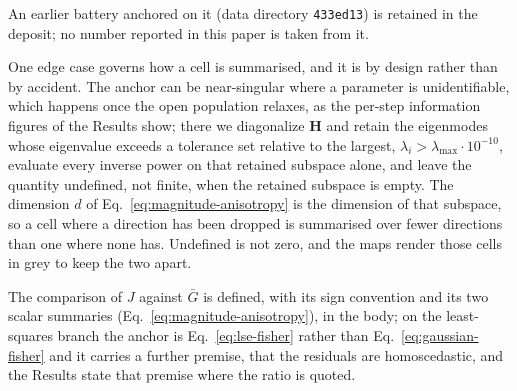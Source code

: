 An earlier battery anchored on it (data directory \texttt{433ed13}) is retained in the
deposit; no number reported in this paper is taken from it.

One edge case governs how a cell is summarised, and it is by design rather than by accident. The anchor can be near-singular where a parameter is unidentifiable, which happens once the open population relaxes, as the per-step information figures of the Results show; there we diagonalize $\mathbf{H}$ and retain the eigenmodes whose eigenvalue exceeds a tolerance set relative to the largest, $\lambda_i > \lambda_{\max}\cdot 10^{-10}$, evaluate every inverse power on that retained subspace alone, and leave the quantity undefined, not finite, when the retained subspace is empty. The dimension $d$ of Eq.~\ref{eq:magnitude-anisotropy} is the dimension of that subspace, so a cell where a direction has been dropped is summarised over fewer directions than one where none has. Undefined is not zero, and the maps render those cells in grey to keep the two apart.

The comparison of $J$ against $\bar G$ is defined, with its sign convention and its two
scalar summaries (Eq.~\ref{eq:magnitude-anisotropy}), in the body; on the least-squares branch the
anchor is Eq.~\ref{eq:lse-fisher} rather than Eq.~\ref{eq:gaussian-fisher} and it
carries a further premise, that the residuals are homoscedastic, and the Results state
that premise where the ratio is quoted.

